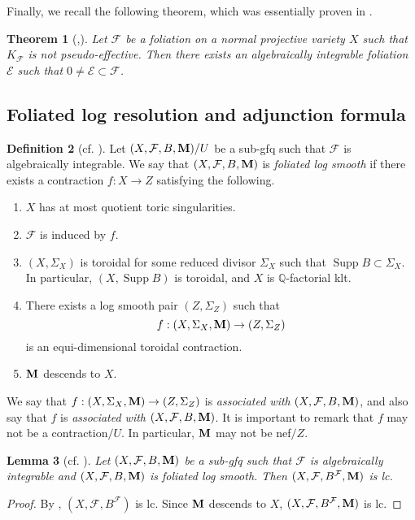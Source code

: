 \documentclass[11pt]{amsart}
\numberwithin{equation}{section}
\newcommand{\Mm}{{\bf{M}}}
\newcommand{\Qq}{\mathbb{Q}}
\newcommand{\Supp}{\operatorname{Supp}}
\newcommand{\Ff}{\mathcal{F}}
\newcommand{\Ee}{\mathcal{E}}
\newtheorem{thm}{Theorem}[subsection]
\newtheorem{lem}[thm]{Lemma}
\theoremstyle{definition}
\newtheorem{defn}[thm]{Definition}
\theoremstyle{definition}
\theoremstyle{definition}
\begin{document}
Finally, we recall the following theorem, which was essentially proven in \cite[Theorem 1.1]{CP19}.

\begin{thm}[{\cite[Theorem 3.1]{LLM23},\cite[Theorem 1.1]{CP19}}]\label{thm: subfoliation algebraic integrable}
Let $\Ff$ be a foliation on a normal projective variety $X$ such that $K_{\Ff}$ is not pseudo-effective. Then there exists an algebraically integrable foliation $\Ee$ such that $0\not=\Ee\subset\Ff$.
\end{thm}


\subsection{Foliated log resolution and adjunction formula}

\begin{defn}[{cf. \cite[\S 3.2]{ACSS21}}]\label{defn: foliated log smooth}
Let $(X,\Ff,B,\Mm)/U$ be a sub-gfq such that $\Ff$ is algebraically integrable. We say that $(X,\Ff,B,\Mm)$ is \emph{foliated log smooth} if there exists a contraction $f: X\rightarrow Z$ satisfying the following.
\begin{enumerate}

  \item $X$ has at most quotient toric singularities.
  \item $\Ff$ is induced by $f$.
  \item $(X,\Sigma_X)$ is toroidal for some reduced divisor $\Sigma_X$ such that $\Supp B\subset\Sigma_X$.  In particular, $(X,\Supp B)$ is toroidal, and $X$ is $\Qq$-factorial klt.
  \item There exists a log smooth pair $(Z,\Sigma_Z)$ such that $$f: (X,\Sigma_X,\Mm)\rightarrow (Z,\Sigma_Z)$$ is an equi-dimensional toroidal contraction.
  \item $\Mm$ descends to $X$.
\end{enumerate}
We say that $f: (X,\Sigma_X,\Mm)\rightarrow (Z,\Sigma_Z)$ is \emph{associated with} $(X,\Ff,B,\Mm)$, and also say that $f$ is \emph{associated with} $(X,\Ff,B,\Mm)$. It is important to remark that $f$ may not be a contraction$/U$. In particular, $\Mm$ may not be nef$/Z$.
\end{defn}


\begin{lem}[cf. {\cite[Lemma 3.1]{ACSS21}}]\label{lem: foliated log smooth imply lc}
Let $(X,\Ff,B,\Mm)$ be a sub-gfq such that $\Ff$ is algebraically integrable and $(X,\Ff,B,\Mm)$ is foliated log smooth. Then $(X,\Ff,B^\Ff,\Mm)$ is lc.
\end{lem}
\begin{proof}
By \cite[Lemma 3.1]{ACSS21}, $(X,\Ff,B^\Ff)$ is lc. Since $\Mm$ descends to $X$, $(X,\Ff,B^\Ff,\Mm)$ is lc.
\end{proof}
\end{document}

